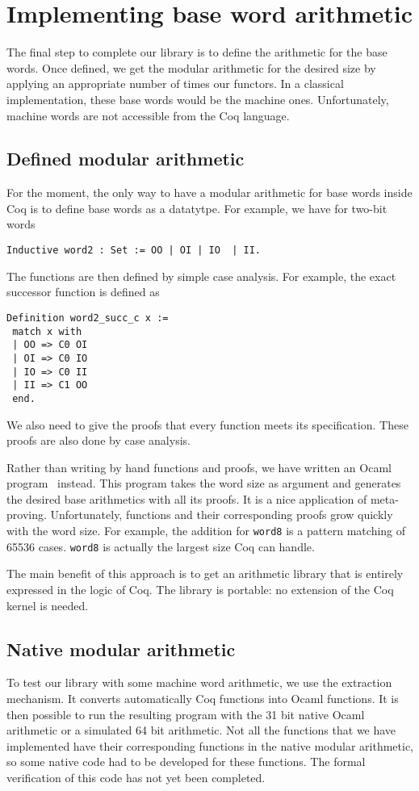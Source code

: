 \section{Implementing base word arithmetic \label{word}}

The final step to complete our library is to define the arithmetic for the base words. 
Once defined,  we get the modular arithmetic for the desired size by applying an appropriate
number of times our functors. In a classical implementation, these base words would be the machine ones.
Unfortunately, machine words are not accessible from the {\sc Coq} language. 

\subsection{Defined modular arithmetic}

For the moment, the only way to have a modular arithmetic for base words inside {\sc Coq}
is to define base words as a datatytpe. For example, we have for two-bit words
\begin{verbatim}
Inductive word2 : Set := OO | OI | IO  | II.
\end{verbatim}
The functions are then defined by simple case analysis. For example,
the exact successor function is defined as
\begin{verbatim}
Definition word2_succ_c x :=
 match x with
 | OO => C0 OI
 | OI => C0 IO
 | IO => C0 II
 | II => C1 OO
 end.
\end{verbatim}
We also need to give the proofs that every function meets its specification.
These proofs are also done by case analysis. 

Rather than writing by hand functions and proofs, we have
written an {\sc Ocaml} program~\cite{ocaml} instead. This program takes the word
size as argument and generates the desired base arithmetics with all
its proofs. It is a nice application of meta-proving. Unfortunately, 
functions and their corresponding proofs grow quickly with the word size. 
For example, the addition for {\tt word8} is a pattern matching of 65536 cases. 
{\tt word8} is actually the largest size {\sc Coq} can handle. 

The main benefit of  this approach is to get an arithmetic library that is entirely expressed 
in the logic of {\sc Coq}. The library is portable: no extension of the {\sc Coq} kernel 
is needed. 

\subsection{Native modular arithmetic}

To test our library with some machine word arithmetic, we use the extraction
mechanism. It converts automatically {\sc Coq} functions into {\sc Ocaml} functions.
It is then possible to run the resulting program with the 31 bit native
{\sc Ocaml} arithmetic or a simulated 64 bit arithmetic. 
Not all the functions that we have implemented have their corresponding functions in the 
native modular arithmetic, so some native code had to be developed for these functions.
The formal verification of this code has not yet been completed.